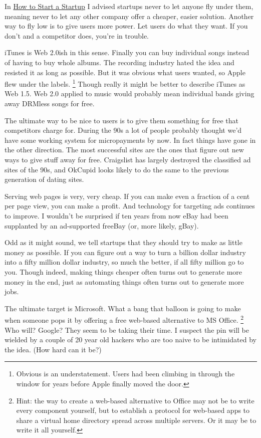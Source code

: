 In \href{start.html}{How to Start a Startup} I advised startups never to
let anyone fly under them, meaning never to let any other company offer
a cheaper, easier solution. Another way to fly low is to give users more
power. Let users do what they want. If you don't and a competitor does,
you're in trouble.

iTunes is Web 2.0ish in this sense. Finally you can buy individual songs
instead of having to buy whole albums. The recording industry hated the
idea and resisted it as long as possible. But it was obvious what users
wanted, so Apple flew under the labels. \footnote{Obvious is an understatement. Users had been climbing in through
the window for years before Apple finally moved the door.} Though
really it might be better to describe iTunes as Web 1.5. Web 2.0 applied
to music would probably mean individual bands giving away DRMless songs
for free.

The ultimate way to be nice to users is to give them something for free
that competitors charge for. During the 90s a lot of people probably
thought we'd have some working system for micropayments by now. In fact
things have gone in the other direction. The most successful sites are
the ones that figure out new ways to give stuff away for free.
Craigslist has largely destroyed the classified ad sites of the 90s, and
OkCupid looks likely to do the same to the previous generation of dating
sites.

Serving web pages is very, very cheap. If you can make even a fraction
of a cent per page view, you can make a profit. And technology for
targeting ads continues to improve. I wouldn't be surprised if ten years
from now eBay had been supplanted by an ad-supported freeBay (or, more
likely, gBay).

Odd as it might sound, we tell startups that they should try to make as
little money as possible. If you can figure out a way to turn a billion
dollar industry into a fifty million dollar industry, so much the
better, if all fifty million go to you. Though indeed, making things
cheaper often turns out to generate more money in the end, just as
automating things often turns out to generate more jobs.

The ultimate target is Microsoft. What a bang that balloon is going to
make when someone pops it by offering a free web-based alternative to MS
Office. \footnote{Hint: the way to create a web-based alternative to Office may
not be to write every component yourself, but to establish a protocol
for web-based apps to share a virtual home directory spread across
multiple servers. Or it may be to write it all yourself.} Who will? Google? They seem to be taking
their time. I suspect the pin will be wielded by a couple of 20 year old
hackers who are too naive to be intimidated by the idea. (How hard can
it be?)

